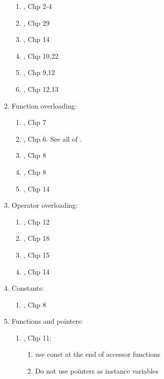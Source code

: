 \begin{enumerate}
\begin{enumerate}
	\item \cite{Meyers2005}, Chp 2-4
	\item \cite{Schildt2003}, Chp 29
	\item \cite{Allain2012}, Chp 14
	\item \cite{Gregoire2014}, Chp 10,22
	\item \cite{Prata2012}, Chp 9,12
	\item \cite{Lippman2013}, Chp 12,13
	\end{enumerate}
\item Function overloading: \vspace{-0.3cm}
	\begin{enumerate} \itemsep -2pt
	\item \cite{Eckel2000}, Chp 7
	\item \cite{Gaddis2010}, Chp 6. See all of \cite{Gaddis2010,Gaddis2011,Gaddis2012}.
	\item \cite{Stroustrup2014}, Chp 8
	\item \cite{Stroustrup2009}, Chp 8
	\item \cite{Schildt2003}, Chp 14
	\end{enumerate}
\item Operator overloading: \vspace{-0.3cm}
	\begin{enumerate} \itemsep -2pt
	\item \cite{Eckel2000}, Chp 12
	\item \cite{Oualline2003}, Chp 18
	\item \cite{Schildt2003}, Chp 15
	\item \cite{Lippman2013}, Chp 14
	\end{enumerate}
\item Constants: \vspace{-0.3cm}
	\begin{enumerate} \itemsep -2pt
	\item \cite{Eckel2000}, Chp 8
	\end{enumerate}
\item Functions and pointers: \vspace{-0.3cm}
	\begin{enumerate} \itemsep -2pt
	\item \cite{Eckel2000}, Chp 11: \vspace{-0.2cm}
		\begin{enumerate} \itemsep -2pt
		\item use const at the end of accessor functions
		\item Do not use pointers as instance variables

\end{enumerate}
\end{enumerate}
\end{enumerate}

